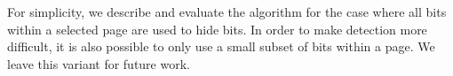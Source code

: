 
For simplicity, we describe and evaluate the algorithm for the case where all bits 
within a selected page are used to hide bits. In order to make detection more
difficult, it is also possible to only use a small subset of bits within a page.
We leave this variant for future work.

